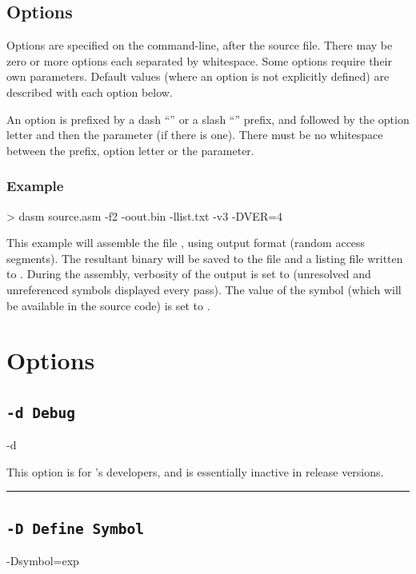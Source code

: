 \subsection{Options}

Options are specified on the command-line, after the source file. There may be zero or more options each separated by whitespace. Some options require their own parameters. Default values (where an option is not explicitly defined) are described with each option below.

An option is prefixed by a dash ``\mono{-}'' or a slash ``\mono{/}'' prefix, and followed by the option letter and then the parameter (if there is one). There must be no whitespace between the prefix, option letter or the parameter.

\subsubsection{Example}
\begin{outputx}
> dasm source.asm -f2 -oout.bin -llist.txt -v3 -DVER=4
\end{outputx}

This example will assemble the file , using output format  (random access segments). The resultant binary will be saved to the file  and a listing file written to . During the assembly, verbosity of the output is set to  (unresolved and unreferenced symbols displayed every pass). The value of the symbol (which will be available in the source code)  is set to .

\section{Options}
\subsection{\texttt{-d Debug}}
\begin{usage}
-d
\end{usage}

\label{changelog:20200824developers}
This option is for \dasm's developers, and is essentially inactive in release versions.
\\
\hrule

\subsection{\texttt{-D Define Symbol}}
\label{flag:definesymbol}
\begin{usage}
-Dsymbol=exp
\end{usage}

